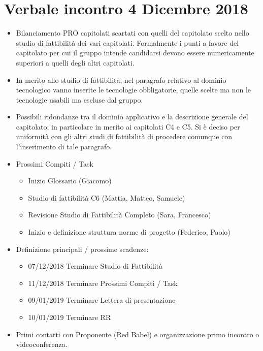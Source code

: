 \section*{Verbale incontro 4 Dicembre 2018}

\begin{itemize}
\item Bilanciamento PRO capitolati scartati con quelli del capitolato scelto
nello studio di fattibilità dei vari capitolati. Formalmente i punti a favore 
del capitolato per cui il gruppo intende candidarsi devono essere numericamente
superiori a quelli degli altri capitolati.
\item In merito allo studio di fattibilità, nel paragrafo relativo al dominio
tecnologico vanno inserite le tecnologie obbligatorie, quelle scelte ma non le
tecnologie usabili ma escluse dal gruppo.
\item Possibili ridondanze tra il dominio applicativo e la descrizione generale
del capitolato; in particolare in merito ai capitolati C4 e C5. Si è deciso per
uniformità con gli altri studi di fattibilità di procedere comunque con
l’inserimento di tale paragrafo.
\item Prossimi Compiti / Task
\begin{itemize}
\item Inizio Glossario (Giacomo)
\item Studio di fattibilità C6 (Mattia, Matteo, Samuele)
\item Revisione Studio di Fattibilità Completo (Sara, Francesco)
\item Inizio e definizione struttura norme di progetto (Federico, Paolo)
\end{itemize}
\item Definizione principali / prossime scadenze:
\begin{itemize}
\item 07/12/2018 Terminare Studio di Fattibilità 
\item 11/12/2018 Terminare Prossimi Compiti / Task
\item 09/01/2019 Terminare Lettera di presentazione
\item 10/01/2019 Terminare RR
\end{itemize}
\item Primi contatti con Proponente (Red Babel) e organizzazione primo incontro
o videoconferenza.
\end{itemize}

